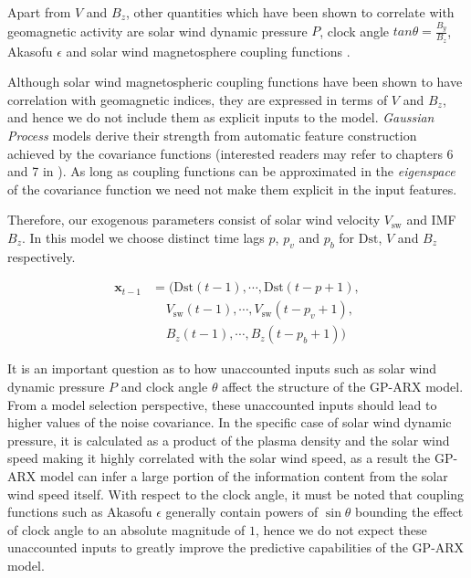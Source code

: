 Apart from $V$ and $B_z$, other quantities which have been shown to correlate with geomagnetic activity are solar wind dynamic pressure $P$, clock angle $tan \theta = \frac{B_y}{B_z}$, Akasofu $\epsilon$ \citep{1986AkasofuE} and solar wind magnetosphere coupling functions \citep{JGRA:JGRA21451}. 

Although solar wind magnetospheric coupling functions have been shown to have correlation with geomagnetic indices, they are expressed in terms of $V$ and $B_z$, and hence we do not include them as explicit inputs to the model. \emph{Gaussian Process} models derive their strength from automatic feature construction achieved by the covariance functions (interested readers may refer to chapters 6 and 7  in \citet{Rasmussen:2005:GPM:1162254}). As long as coupling functions can be approximated in the \emph{eigenspace} of the covariance function we need not make them explicit in the input features. 

Therefore, our exogenous parameters consist of solar wind velocity $ V_{\text{sw}}$ and IMF $B_z$. In this model we choose distinct time lags $p$, $p_{v}$ and $p_{b}$ for $\mathrm{Dst}$, $V$ and $B_z$ respectively.
    
\begin{align*}
       \mathbf{x}_{t-1} & = (\mathrm{Dst}(t-1), \cdots , \mathrm{Dst}(t-p+1), \\
        & \ \ \ \ \  V_{\text{sw}}(t-1), \cdots, V_{\text{sw}}(t-p_{v}+1),\\
        & \ \ \ \ \  B_{z}(t-1), \cdots, B_{z}(t-p_{b}+1))
\end{align*}

It is an important question as to how unaccounted inputs such as solar wind dynamic pressure $P$ and clock angle $\theta$ affect the structure of the GP-ARX model. From a model selection perspective, these unaccounted inputs should lead to higher values of the noise covariance. In the specific case of solar wind dynamic pressure, it is calculated as a product of the plasma density and the solar wind speed making it highly correlated with the solar wind speed, as a result the GP-ARX model can infer a large portion of the information content from the solar wind speed itself. With respect to the clock angle, it must be noted that coupling functions such as Akasofu $\epsilon$ generally contain powers of $\sin \theta$ bounding the effect of clock angle to an absolute magnitude of $1$, hence we do not expect these unaccounted inputs to greatly improve the predictive capabilities of the GP-ARX model.


